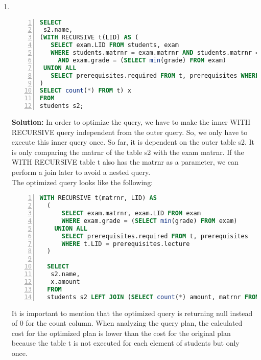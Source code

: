 \begin{enumerate}
\begin{lstlisting}[language=sql,numbers=left, stepnumber=1, numberstyle = \tiny,escapechar=|]
  SELECT DISTINCT p.name, p.position
  FROM professors p, lectures l
  WHERE 
    l.LID IN                                   |\label{line:start_exist}|
      (SELECT LID                                  |\label{line:start_simplify}|
      FROM exam
      ORDER BY grade LIMIT 2)                                          
   AND p.PID = l.heldby;                         |\label{line:outer_p_o_joinpred}| 
\end{lstlisting}

        
When looking at the query plans, the cost is noticeably lower than the cost of the original query. The main reason for this is that the optimized query has to execute one join less than the original query.
\item \
\begin{lstlisting}[language=sql,numbers=left, stepnumber=1, numberstyle = \tiny]
SELECT
 s2.name,
(WITH RECURSIVE t(LID) AS (
   SELECT exam.LID FROM students, exam
   WHERE students.matrnr = exam.matrnr AND students.matrnr = s2.matrnr
     AND exam.grade = (SELECT min(grade) FROM exam)
 UNION ALL
   SELECT prerequisites.required FROM t, prerequisites WHERE t.LID = prerequisites.lecture
)
SELECT count(*) FROM t) x
FROM
students s2;\end{lstlisting}

\newpage
{\bf Solution:}
In order to optimize the query, we have to make the inner WITH RECURSIVE query independent from the outer query. So, we only have to execute this inner query once. 
So far, it is dependent on the outer table s2. It is only comparing the matrnr of the table s2 with the exam matrnr. If the WITH RECURSIVE table t also has the matrnr as a
parameter, we can perform a join later to avoid a nested query.\\ 
The optimized query looks like the following:
\begin{lstlisting}[language=sql,numbers=left, stepnumber=1, numberstyle = \tiny]
  WITH RECURSIVE t(matrnr, LID) AS 
  (
      SELECT exam.matrnr, exam.LID FROM exam
      WHERE exam.grade = (SELECT min(grade) FROM exam)
    UNION ALL
      SELECT prerequisites.required FROM t, prerequisites 
      WHERE t.LID = prerequisites.lecture
  )

  SELECT
   s2.name,
   x.amount 
  FROM
  students s2 LEFT JOIN (SELECT count(*) amount, matrnr FROM t) x ON (s.matrnr = x.matrnr);
\end{lstlisting}

It is important to mention that the optimized query is returning null instead of 0 for the count column. When analyzing the query plan, the calculated cost for the optimized plan
is lower than the cost for the original plan because the table t is not executed for each element of students but only once.

\end{enumerate}

